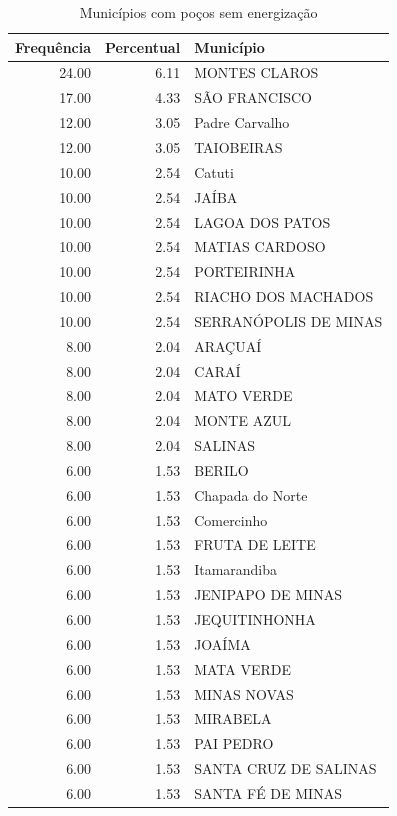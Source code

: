 \documentclass[a4paper, 12pt, openright, oneside, english, brazil, article]{abntex2}
\begin{document}
	\begin{scriptsize}
		\begin{longtable}{rrl}
			\caption{Municípios com poços sem energização} \\ 
			\hline
			Frequência & Percentual & Município \\ 
			\hline
			24.00 & 6.11 & MONTES CLAROS \\ 
			17.00 & 4.33 & SÃO FRANCISCO \\ 
			12.00 & 3.05 & Padre Carvalho \\ 
			12.00 & 3.05 & TAIOBEIRAS \\ 
			10.00 & 2.54 & Catuti \\ 
			10.00 & 2.54 & JAÍBA \\ 
			10.00 & 2.54 & LAGOA DOS PATOS \\ 
			10.00 & 2.54 & MATIAS CARDOSO \\ 
			10.00 & 2.54 & PORTEIRINHA \\ 
			10.00 & 2.54 & RIACHO DOS MACHADOS \\ 
			10.00 & 2.54 & SERRANÓPOLIS DE MINAS \\ 
			8.00 & 2.04 & ARAÇUAÍ \\ 
			8.00 & 2.04 & CARAÍ \\ 
			8.00 & 2.04 & MATO VERDE \\ 
			8.00 & 2.04 & MONTE AZUL \\ 
			8.00 & 2.04 & SALINAS \\ 
			6.00 & 1.53 & BERILO \\ 
			6.00 & 1.53 & Chapada do Norte \\ 
			6.00 & 1.53 & Comercinho \\ 
			6.00 & 1.53 & FRUTA DE LEITE \\ 
			6.00 & 1.53 & Itamarandiba \\ 
			6.00 & 1.53 & JENIPAPO DE MINAS \\ 
			6.00 & 1.53 & JEQUITINHONHA \\ 
			6.00 & 1.53 & JOAÍMA \\ 
			6.00 & 1.53 & MATA VERDE \\ 
			6.00 & 1.53 & MINAS NOVAS \\ 
			6.00 & 1.53 & MIRABELA \\ 
			6.00 & 1.53 & PAI PEDRO \\ 
			6.00 & 1.53 & SANTA CRUZ DE SALINAS \\ 
			6.00 & 1.53 & SANTA FÉ DE MINAS \\ 

\end{longtable}
\end{scriptsize}
\end{document}
